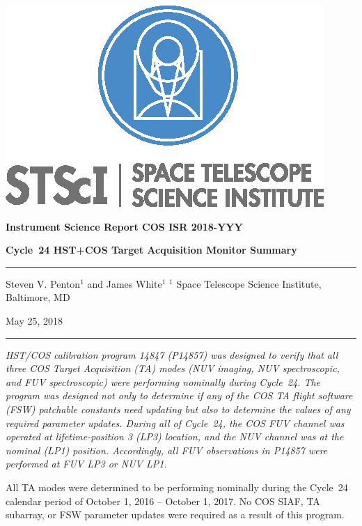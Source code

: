 \documentclass[12pt]{reportj}
\newcommand{\pid}[1]{{\rm P}#1}
\newcommand{\thisISR}[1]{COS ISR 2018-YYY}
\begin{document}
\vspace{-2.5cm}
\noindent\includegraphics*[width=0.295\linewidth]{new_st_logo.eps}

\vspace{-0.5cm}

\begin{flushright}
{\bf Instrument Science Report \thisISR{}}

\vspace{1.0cm}
{\bf\Huge Cycle~24 HST+COS Target Acquisition Monitor Summary}

\rule{0.25\linewidth}{0.5pt}

\vspace{0.4cm}
Steven V. Penton$^1$ and James White$^1$
\linebreak
\newline
\footnotesize{$^1$ Space Telescope Science Institute, Baltimore, MD}
\vspace{0.5cm}

May 25, 2018
\end{flushright}
\vspace{-0.3cm}
\noindent\rule{\linewidth}{1.0pt}

{\it \noindent
HST/COS calibration program 14847 (\pid{14857}) was designed to verify that all three COS Target Acquisition (TA) modes (NUV imaging, NUV spectroscopic, and FUV spectroscopic)
 were performing nominally during Cycle~24. The program was designed not only to determine if any of the COS TA flight software (FSW) patchable constants need updating but also to determine the values of any required parameter updates.
During all of Cycle~24, the COS FUV channel was operated at lifetime-position 3 (LP3) location, and the NUV channel was at the nominal (LP1) position. Accordingly, all FUV observations in \pid{14857} were performed at FUV LP3 or NUV LP1.

All TA modes were determined to be performing nominally during the Cycle~24 calendar period of October 1, 2016 -- October 1, 2017. No COS SIAF, TA subarray, or FSW parameter updates were required as a result of this program. }
\end{document}
